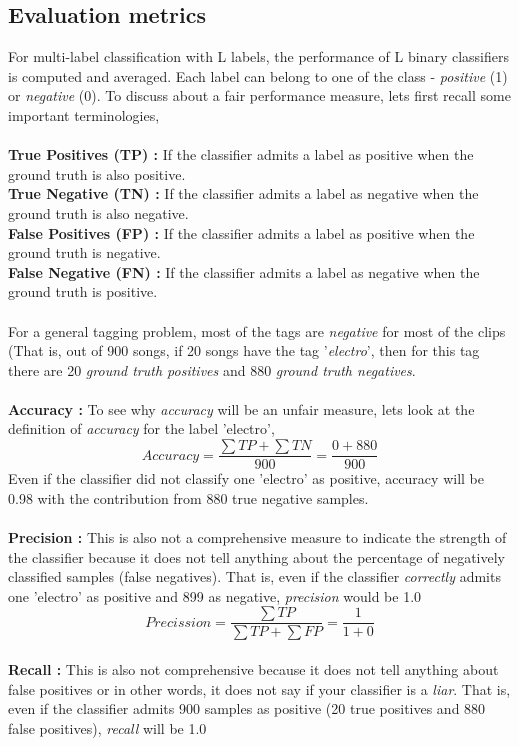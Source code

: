 \subsection{Evaluation metrics}
\label{evaluation}
For multi-label classification with L labels, the performance of L binary classifiers is computed and averaged. Each label can belong to one of the class - \textit{positive} (1) or \textit{negative} (0). To discuss about a fair performance measure, lets first recall some important terminologies,\\
\\
\textbf{True Positives (TP) :} If the classifier admits a label as positive when the ground truth is also positive.\\
\textbf{True Negative (TN) :} If the classifier admits a label as negative when the ground truth is also negative.\\
\textbf{False Positives (FP) :} If the classifier admits a label as positive when the ground truth is negative.\\
\textbf{False Negative (FN) :} If the classifier admits a label as negative when the ground truth is positive.\\
\\
For a general tagging problem, most of the tags are \textit{negative} for most of the clips (That is, out of 900 songs, if 20 songs have the tag '\textit{electro}', then for this tag there are 20 \textit{ground truth positives} and 880 \textit{ground truth negatives}.\\
\\
\textbf{Accuracy :} To see why \textit{accuracy} will be an unfair measure, lets look at the definition of \textit{accuracy} for the label 'electro',
\[
  Accuracy = \frac{\sum TP + \sum TN}{900} = \frac{0+880}{900}
\]
Even if the classifier did not classify one 'electro' as positive, accuracy will be 0.98 with the contribution from 880 true negative samples.\\
\\
\textbf{Precision :} This is also not a comprehensive measure to indicate the strength of the classifier because it does not tell anything about the percentage of negatively classified samples (false negatives). That is, even if the classifier \textit{correctly} admits one 'electro' as positive and 899 as negative, \textit{precision} would be 1.0   
\[
  Precission = \frac{\sum TP}{\sum TP + \sum FP} = \frac{1}{1+0}
\]
\\
\textbf{Recall :} This is also not comprehensive because it does not tell anything about false positives or in other words, it does not say if your classifier is a \textit{liar}. That is, even if the classifier admits 900 samples as positive (20 true positives and 880 false positives), \textit{recall} will be 1.0
